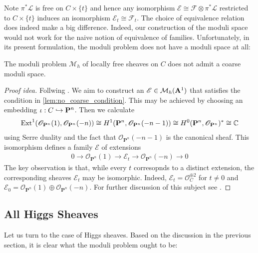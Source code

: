 \documentclass[12pt]{ociamthesis}  %
\begin{document}
Note $\pi^*\mathscr L$ is free on $C\times\{t\}$ and hence
any isomorphism $\mathscr E\cong\mathscr F\otimes\pi^*\mathscr L$
restricted to $C\times\{t\}$ induces an isomorphism
$\mathscr E_t \cong \mathscr F_t$.
The choice of equivalence relation does indeed make a big difference.
Indeed, our construction of the moduli space would not work for the
naive notion of equivalence of families.
Unfortunately, in its present formulation, the moduli problem does not
have a moduli space at all:

\begin{lemma}\label{lem:no_coarse_moduli_space}
  The moduli problem $\mathcal M_h$ of locally free sheaves on $C$
  does not admit a coarse moduli space.
  \begin{proof}[Proof idea]
    Follwing \cite[Example 2.22]{hoskins2016}. 
    We aim to construct
    an $\mathscr E\in\mathcal M_h(\mathbf{A}^{1}_{})$ that satisfies the
    condition in \ref{lem:no_coarse_condition}. This may be achieved
    by choosing an embedding $\iota : C\hookrightarrow\mathbf{P}^{n}_{}$. Then 
    we calculate
    \begin{align*}
      \operatorname{Ext}^1(\mathscr O_{\mathbf P^n}(1),\mathscr O_{\mathbf P^n}(-n)) 
      \cong H^1(\mathbf P^n,\mathscr O_{\mathbf P^n}(-n-1))
      \cong H^0(\mathbf P^n,\mathscr O_{\mathbf P^n})^* 
      \cong \mathbb C
    \end{align*}
    using Serre duality and the fact that $\mathscr O_{\mathbf P^n}(-n-1)$
    is the canonical sheaf. This isomorphism
    defines a family $\mathscr E$ of extensions
    \begin{align*}
      0
      \to \mathscr O_{\mathbf P^n}(1)
      \to \mathscr E_t
      \to \mathscr O_{\mathbf P^n}(-n)
      \to 0
    \end{align*}
    The key observation is that, while every $t$ corresopnds to a
    distinct extension, the corresponding sheaves $\mathscr E_t$
    may be isomorphic. Indeed, $\mathscr E_t = \mathscr O_C^{\oplus 2}$
    for $t\neq 0$ and
    $\mathscr E_0 = \mathscr O_{\mathbf P^n}(1) \oplus\mathscr O_{\mathbf P^n}(-n)$.
    For further discussion of this subject see
    \cite[Sections 5.1]{newstead1978}.
  \end{proof}
\end{lemma}

\subsection{All Higgs Sheaves}

Let us turn to the case of Higgs sheaves. Based on the discussion
in the previous section, it is clear what the moduli problem ought to be:
\end{document}
